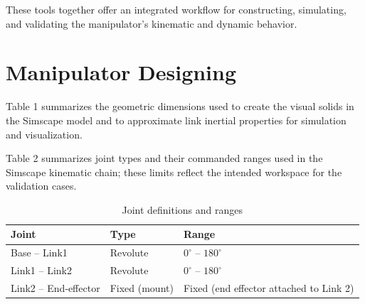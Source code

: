\documentclass[12pt]{article}
\begin{document}
These tools together offer an integrated workflow for constructing, simulating, and validating the manipulator’s kinematic and dynamic behavior.

\section*{Manipulator Designing}

Table 1 summarizes the geometric dimensions used to create the visual solids in the Simscape model and to approximate link inertial properties for simulation and visualization.

\begin{table}[H]
    \centering
    \label{tab:geom}
    \small
    \caption{Physical dimensions of base, links and end‑effector}
\end{table}

Table 2 summarizes joint types and their commanded ranges used in the Simscape kinematic chain; these limits reflect the intended workspace for the validation cases.

\begin{table}[H]
    \centering
    \label{tab:joints}
    \begin{tabular}{@{}l l l@{}}
        \hline
        Joint                 & Type          & Range                                   \\
        \hline
        Base -- Link1         & Revolute      & $0^\circ$ -- $180^\circ$                \\
        Link1 -- Link2        & Revolute      & $0^\circ$ -- $180^\circ$                \\
        Link2 -- End‑effector & Fixed (mount) & Fixed (end effector attached to Link 2) \\
        \hline
    \end{tabular}
    \caption{Joint definitions and ranges}
\end{table}
\end{document}
